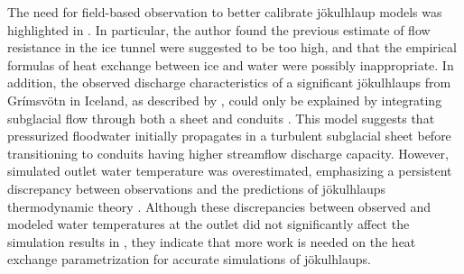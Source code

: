 The need for field-based observation to better calibrate jökulhlaup models was highlighted in \cite{Clarke2003}. In particular, the author found the previous estimate of flow resistance in the ice tunnel were suggested to be too high, and that the empirical formulas of heat exchange between ice and water were possibly inappropriate. In addition, the observed discharge characteristics of a significant jökulhlaups from Grímsvötn in Iceland, as described by \cite{Bjornsson1996}, could only be explained by integrating subglacial flow through both a sheet and conduits \citep{Flowers&al2004}. This model suggests that pressurized floodwater initially propagates in a turbulent subglacial sheet before transitioning to conduits having higher streamflow discharge capacity. However, simulated outlet water temperature was overestimated, emphasizing a persistent discrepancy between observations and the predictions of jökulhlaups thermodynamic theory \citep[as already indicated by ][]{Clarke2003}. Although these discrepancies between observed and modeled water temperatures at the outlet did not significantly affect the simulation results in \cite{Flowers&al2004}, they indicate that more work is needed on the heat exchange parametrization for accurate simulations of jökulhlaups. 

